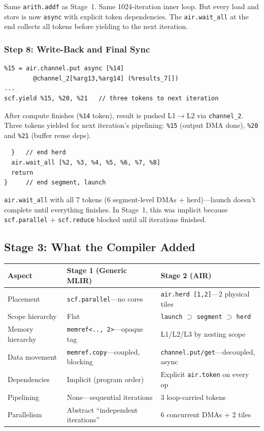 \documentclass[11pt,a4paper]{article}
\begin{document}
Same \texttt{arith.addf} as Stage~1. Same 1024-iteration inner loop. But every
load and store is now \texttt{async} with explicit token dependencies. The
\texttt{air.wait\_all} at the end collects all tokens before yielding to the next
iteration.

\subsubsection{Step 8: Write-Back and Final Sync}
\begin{lstlisting}
%15 = air.channel.put async [%14]
        @channel_2[%arg13,%arg14] (%results_7[])
...
scf.yield %15, %20, %21   // three tokens to next iteration
\end{lstlisting}

After compute finishes (\texttt{\%14} token), result is pushed L1$\rightarrow$L2 via
\texttt{channel\_2}. Three tokens yielded for next iteration's pipelining:
\texttt{\%15} (output DMA done), \texttt{\%20} and \texttt{\%21} (buffer reuse deps).

\begin{lstlisting}
  }   // end herd
  air.wait_all [%2, %3, %4, %5, %6, %7, %8]
  return
}     // end segment, launch
\end{lstlisting}

\texttt{air.wait\_all} with all 7 tokens (6 segment-level DMAs + herd)---launch
doesn't complete until everything finishes. In Stage~1, this was implicit because
\texttt{scf.parallel} + \texttt{scf.reduce} blocked until all iterations finished.


\subsection{Stage 3: What the Compiler Added}

\begin{center}
\small
\begin{tabular}{lll}
\toprule
\textbf{Aspect} & \textbf{Stage 1 (Generic MLIR)} & \textbf{Stage 2 (AIR)} \\
\midrule
Placement & \texttt{scf.parallel}---no cores &
  \texttt{air.herd [1,2]}---2 physical tiles \\
Scope hierarchy & Flat &
  \texttt{launch} $\supset$ \texttt{segment} $\supset$ \texttt{herd} \\
Memory hierarchy & \texttt{memref<.., 2>}---opaque tag &
  L1/L2/L3 by nesting scope \\
Data movement & \texttt{memref.copy}---coupled, blocking &
  \texttt{channel.put/get}---decoupled, async \\
Dependencies & Implicit (program order) &
  Explicit \texttt{air.token} on every op \\
Pipelining & None---sequential iterations &
  3 loop-carried tokens \\
Parallelism & Abstract ``independent iterations'' &
  6 concurrent DMAs + 2 tiles \\
\bottomrule
\end{tabular}
\end{center}
\end{document}
